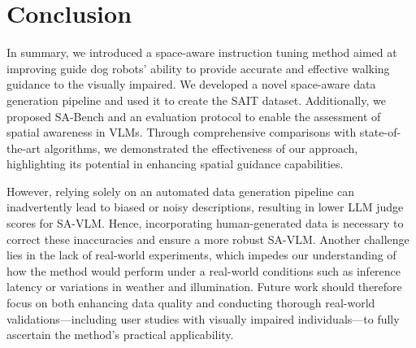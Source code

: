\section{Conclusion}
In summary, we introduced a space-aware instruction tuning method aimed at improving guide dog robots' ability to provide accurate and effective walking guidance to the visually impaired.
We developed a novel space-aware data generation pipeline and used it to create the SAIT dataset. 
Additionally, we proposed SA-Bench and an evaluation protocol to enable the assessment of spatial awareness in VLMs.
Through comprehensive comparisons with state-of-the-art algorithms, we demonstrated the effectiveness of our approach, highlighting its potential in enhancing spatial guidance capabilities.

However, relying solely on an automated data generation pipeline can inadvertently lead to biased or noisy descriptions, resulting in lower LLM judge scores for SA-VLM. 
Hence, incorporating human-generated data is necessary to correct these inaccuracies and ensure a more robust SA-VLM.
Another challenge lies in the lack of real-world experiments, which impedes our understanding of how the method would perform under a real-world conditions such as inference latency or variations in weather and illumination. 
Future work should therefore focus on both enhancing data quality and conducting thorough real-world validations—including user studies with visually impaired individuals—to fully ascertain the method’s practical applicability. 




